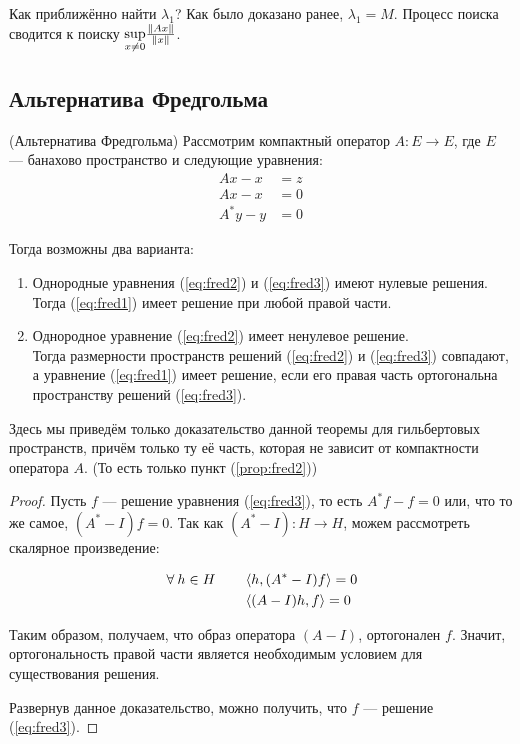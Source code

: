 \documentclass[12pt]{article}
\begin{document}
			Как приближённо найти $\lambda_1$? Как было доказано ранее, $\lambda_1 = M$. Процесс поиска сводится к поиску 
			$\underset{x\neq0}{\sup}{\frac{\left\| Ax \right\|}{\left\| x \right\|}}$.
	
	\subsection{Альтернатива Фредгольма}
	
		\begin{theorem}
			(Альтернатива Фредгольма) Рассмотрим компактный оператор $A: E\rightarrow E$, где $E$ --- банахово 
			пространство и следующие уравнения:
			\begin{align}
				Ax - x &= z   \tag{но} \label{eq:fred1} \\
				Ax - x &= 0   \tag{о} \label{eq:fred2} \\
				A^*y - y &= 0 \tag{со} \label{eq:fred3}
			\end{align}
		
			Тогда возможны два варианта:
			\begin{enumerate}
				\item Однородные уравнения (\ref{eq:fred2}) и (\ref{eq:fred3}) имеют нулевые решения. \label{prop:fred1}\\
				Тогда (\ref{eq:fred1}) имеет решение при любой правой части.
			
				\item Однородное уравнение (\ref{eq:fred2}) имеет ненулевое решение. \label{prop:fred2}\\
				Тогда размерности пространств решений (\ref{eq:fred2}) и (\ref{eq:fred3}) совпадают,
				а уравнение (\ref{eq:fred1}) имеет решение, если его правая часть ортогональна 
				пространству решений (\ref{eq:fred3}).
			\end{enumerate}
		\end{theorem}
		Здесь мы приведём только доказательство данной теоремы для гильбертовых пространств, причём только ту её 
		часть, которая не зависит от компактности оператора $A$. (То есть только пункт (\ref{prop:fred2}))
		\begin{proof}
			Пусть $f$ --- решение уравнения (\ref{eq:fred3}), то есть $A^*f - f = 0$ или, что то же самое, 
			$(A^* - I)f = 0$. Так как $(A^* - I): H \rightarrow H$, можем рассмотреть скалярное произведение:
		
			\begin{align*}
				\forall h \in H \qquad &\scal{h}{(A^*-I)f} = 0 \\
					                   &\scal{(A-I)h}{f} = 0
			\end{align*}
		
			Таким образом, получаем, что образ оператора $(A-I)$, ортогонален $f$. Значит, ортогональность 
			правой части является необходимым условием для существования решения.
		
			Развернув данное доказательство, можно получить, что $f$ --- решение (\ref{eq:fred3}).
		\end{proof}
	
\end{document}
